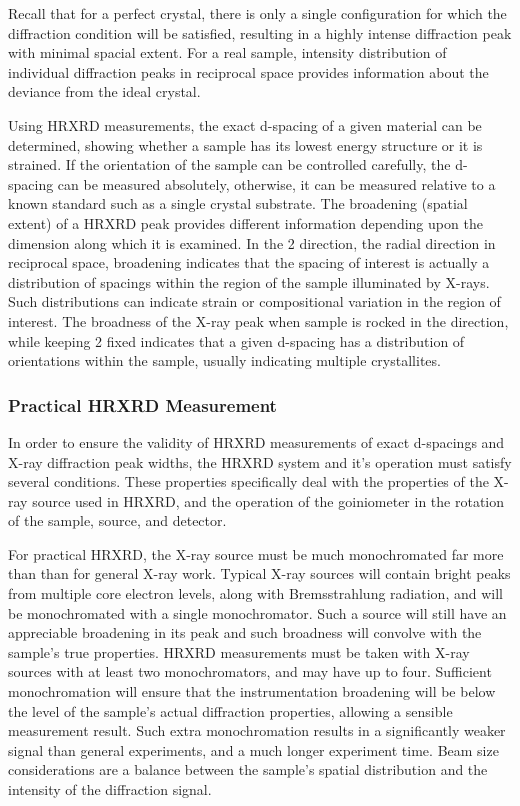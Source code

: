 Recall that for a perfect crystal, there is only a single configuration for which the diffraction condition will be satisfied, resulting in a highly intense diffraction peak with minimal spacial extent.
For a real sample, intensity distribution of individual diffraction peaks in reciprocal space provides information about the deviance from the ideal crystal.

Using HRXRD measurements, the exact d-spacing of a given material can be determined, showing whether a sample has its lowest energy structure or it is strained.
If the orientation of the sample can be controlled carefully, the d-spacing can be measured absolutely, otherwise, it can be measured relative to a known standard such as a single crystal substrate.
The broadening (spatial extent) of a HRXRD peak provides different information depending upon the dimension along which it is examined.
In the 2\straighttheta{} direction, the radial direction in reciprocal space, broadening indicates that the spacing of interest is actually a distribution of spacings within the region of the sample illuminated by X-rays.
Such distributions can indicate strain or compositional variation in the region of interest.
The broadness of the X-ray peak when sample is rocked in the \textomega{} direction, while keeping 2\straighttheta{} fixed indicates that a given d-spacing has a distribution of orientations within the sample, usually indicating multiple crystallites.

\subsubsection{Practical HRXRD Measurement} In order to ensure the validity of HRXRD measurements of exact d-spacings and X-ray diffraction peak widths, the HRXRD system and it's operation must satisfy several conditions.
These properties specifically deal with the properties of the X-ray source used in HRXRD, and the operation of the goiniometer in the rotation of the sample, source, and detector.

For practical HRXRD, the X-ray source must be much monochromated far more than than for general X-ray work.
Typical X-ray sources will contain bright peaks from multiple core electron levels, along with Bremsstrahlung radiation, and will be monochromated with a single monochromator.
Such a source will still have an appreciable broadening in its peak and such broadness will convolve with the sample's true properties.
HRXRD measurements must be taken with X-ray sources with at least two monochromators, and may have up to four.
Sufficient monochromation will ensure that the instrumentation broadening will be below the level of the sample's actual diffraction properties, allowing a sensible measurement result.
Such extra monochromation results in a significantly weaker signal than general experiments, and a much longer experiment time.
Beam size considerations are a balance between the sample's spatial distribution and the intensity of the diffraction signal.

